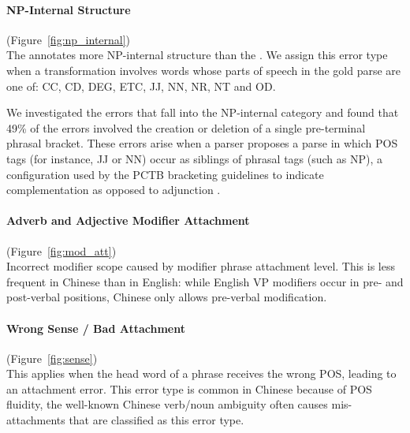 \begin{figure}
\begin{minipage}[b]{0.45\textwidth}
\centering

\end{minipage}\hfill
\begin{minipage}[b]{0.5\textwidth}
\centering

\end{minipage}
\end{figure}

\paragraph{NP-Internal Structure} (Figure~\ref{fig:np_internal}) \\
The \pctb annotates more NP-internal structure than the \ptb.
We assign this error type when a transformation involves words whose parts of speech in the gold parse are one of: CC, CD, DEG, ETC, JJ, NN, NR, NT and OD.

We investigated the errors that fall into the NP-internal category and found that 49\% of the errors involved the creation or deletion of a single pre-terminal phrasal bracket.
These errors arise when a parser proposes a parse in which POS tags (for instance, JJ or NN) occur as siblings of phrasal tags (such as NP), a configuration used by the PCTB bracketing guidelines to indicate complementation as opposed to adjunction \parencite{Xue:2005:NLE}.

\paragraph{Adverb and Adjective Modifier Attachment} (Figure~\ref{fig:mod_att}) \\
Incorrect modifier scope caused by modifier phrase attachment level.
This is less frequent in Chinese than in English: while English VP modifiers occur in pre- and post-verbal positions, Chinese only allows pre-verbal modification.

\paragraph{Wrong Sense / Bad Attachment} (Figure~\ref{fig:sense}) \\
This applies when the head word of a phrase receives the wrong POS, leading to an attachment error.
This error type is common in Chinese because of POS fluidity, \myeg the well-known Chinese verb/noun ambiguity often causes mis-attachments that are classified as this error type.

